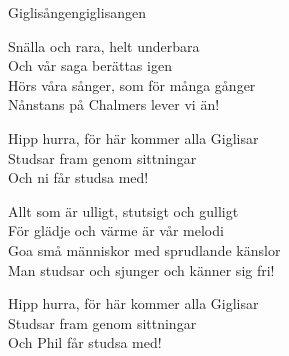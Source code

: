\begin{song}{Giglisången}{giglisangen}
\begin{vers}
Snälla och rara, helt underbara\\
Och vår saga berättas igen\\ 
Hörs våra sånger, som för många gånger\\
Nånstans på Chalmers lever vi än!\\
\end{vers}
\begin{vers}
Hipp hurra, för här kommer alla Giglisar\\
Studsar fram genom sittningar\\
Och ni får studsa med!\\
\end{vers}
\begin{vers}
Allt som är ulligt, stutsigt och gulligt\\
För glädje och värme är vår melodi\\
Goa små människor med sprudlande känslor\\
Man studsar och sjunger och känner sig fri!\\
\end{vers}
\begin{vers}
Hipp hurra, för här kommer alla Giglisar\\
Studsar fram genom sittningar\\
Och Phil får studsa med!\\
\end{vers}
\end{song}